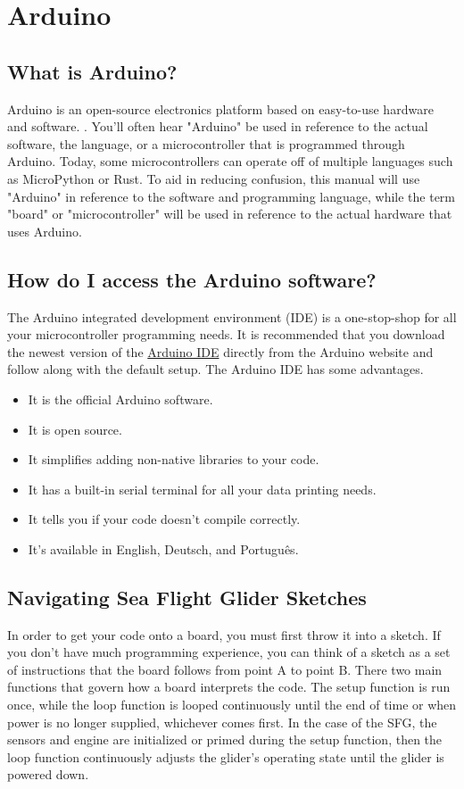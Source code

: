 \chapter*{Arduino}
\section{What is Arduino?}
Arduino is an open-source electronics platform based on easy-to-use hardware and software. \citep{Arduino}. You'll often hear "Arduino" be used in reference to the actual software, the language, or a microcontroller that is programmed through Arduino. Today, some microcontrollers can operate off of multiple languages such as MicroPython or Rust. To aid in reducing confusion, this manual will use "Arduino" in reference to the software and programming language, while the term "board" or "microcontroller" will be used in reference to the actual hardware that uses Arduino.

\section{How do I access the Arduino software?}
The Arduino integrated development environment (IDE) is a one-stop-shop for all your microcontroller programming needs. It is recommended that you download the newest version of the \href{https://www.arduino.cc/en/software}{Arduino IDE} directly from the Arduino website and follow along with the default setup. The Arduino IDE has some advantages.

\begin{itemize}
	\item It is the official Arduino software.
	\item It is open source.
	\item It simplifies adding non-native libraries to your code.
	\item It has a built-in serial terminal for all your data printing needs.
	\item It tells you if your code doesn't compile correctly.
	\item It's available in English, Deutsch, and Portugu\^{e}s.
\end{itemize}


\section{Navigating Sea Flight Glider Sketches}
In order to get your code onto a board, you must first throw it into a sketch. If you don't have much programming experience, you can think of a sketch as a set of instructions that the board follows from point A to point B. There two main functions that govern how a board interprets the code. The setup function is run once, while the loop function is looped continuously until the end of time or when power is no longer supplied, whichever comes first. In the case of the SFG, the sensors and engine are initialized or primed during the setup function, then the loop function continuously adjusts the glider's operating state until the glider is powered down.

